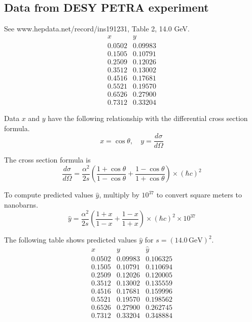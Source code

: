 \documentclass[12pt]{article}
\begin{document}
\subsection*{Data from DESY PETRA experiment}
See www.hepdata.net/record/ins191231, Table 2, 14.0 GeV.
\begin{equation*}
\begin{matrix}
x & y\\
0.0502 & 0.09983\\
0.1505 & 0.10791\\
0.2509 & 0.12026\\
0.3512 & 0.13002\\
0.4516 & 0.17681\\
0.5521 & 0.19570\\
0.6526 & 0.27900\\
0.7312 & 0.33204
\end{matrix}
\end{equation*}

Data $x$ and $y$ have the following relationship
with the differential cross section formula.
\begin{equation*}
x=\cos\theta,
\quad
y=\frac{d\sigma}{d\Omega}
\end{equation*}

The cross section formula is
\begin{equation*}
\frac{d\sigma}{d\Omega}
=
\frac{\alpha^2}{2s}
\left(
\frac{1+\cos\theta}{1-\cos\theta}+
\frac{1-\cos\theta}{1+\cos\theta}
\right)\times(\hbar c)^2
\end{equation*}

To compute predicted values $\hat{y}$,
multiply by $10^{37}$ to convert square meters to nanobarns.
\begin{equation*}
\hat{y}
=
\frac{\alpha^2}{2s}
\left(
\frac{1+x}{1-x}+
\frac{1-x}{1+x}
\right)
\times(\hbar c)^2
\times10^{37}
\end{equation*}

The following table shows predicted values $\hat y$ for $s=(14.0\,\text{GeV})^2$.
\begin{equation*}
\begin{matrix}
x & y & \hat y\\
0.0502 & 0.09983 & 0.106325\\
0.1505 & 0.10791 & 0.110694\\
0.2509 & 0.12026 & 0.120005\\
0.3512 & 0.13002 & 0.135559\\
0.4516 & 0.17681 & 0.159996\\
0.5521 & 0.19570 & 0.198562\\
0.6526 & 0.27900 & 0.262745\\
0.7312 & 0.33204 & 0.348884\\
\end{matrix}
\end{equation*}
\end{document}
